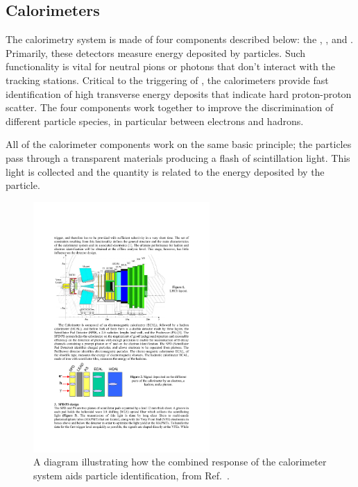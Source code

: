\subsection{Calorimeters}

The calorimetry system is made of four components described below: the \spd, \presh, \ecal and \hcal.
Primarily, these detectors measure energy deposited by particles. Such functionality is vital for neutral pions or photons that don't interact with the tracking stations. Critical to the triggering of \lhcb, the calorimeters provide fast identification of high transverse energy deposits that indicate hard proton-proton scatter. The four components work together to improve the discrimination of different particle species, in particular between electrons and hadrons. 



All of the calorimeter components work on the same basic principle; the particles pass through a transparent materials producing a flash of scintillation light. This light is collected and the quantity is related to the energy deposited by the particle.  



\begin{figure}[!h]
    \centering
    \includegraphics[width=0.6\textwidth]{figs/Detector/calo_layout.pdf}
    \caption{A diagram illustrating how the combined response of the calorimeter system aids particle identification, from Ref.~\cite{1742-6596-293-1-012059}.}
    \label{fig:Dec_calo_layout}   
\end{figure}



